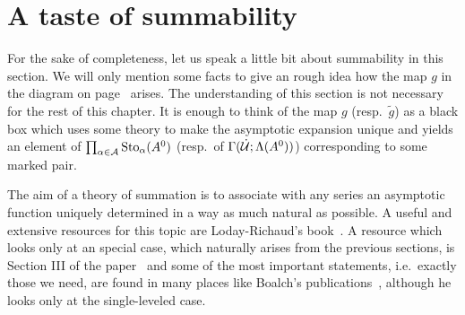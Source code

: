 \section{A taste of summability}\label{app:multisummability}
For the sake of completeness, let us speak a little bit about summability in
this section. We will only mention some facts to give an rough idea how the map
$g$ in the diagram on page~\pageref{page:ofPreDiagram} arises.
The understanding of this section is not necessary for the rest of this
chapter. It is enough to think of the map $g$ (resp.\ $\tilde g$) as a black box
which uses some theory to make the asymptotic expansion unique and yields an
element of $\prod_{\alpha\in\mathcal{A}}\operatorname{Sto}_\alpha(A^0)$ (resp.\ of
$\Gamma(\dot{\mathcal{U}};\Lambda(A^0))$) corresponding to some marked pair.

The aim of a theory of summation is to associate with any series an asymptotic
function uniquely determined in a way as much natural as possible.
A useful and extensive resources for this topic are Loday-Richaud's
book~\cite{Loday2014}.
A resource which looks only at an special case, which naturally arises from the
previous sections, is Section III of the paper~\cite{Loday1994} and some of the
most important statements, i.e.\ exactly those we need, are found in many places
like Boalch's publications~\cite{boalch,thboalch}, although he looks only at the
single-leveled case.

